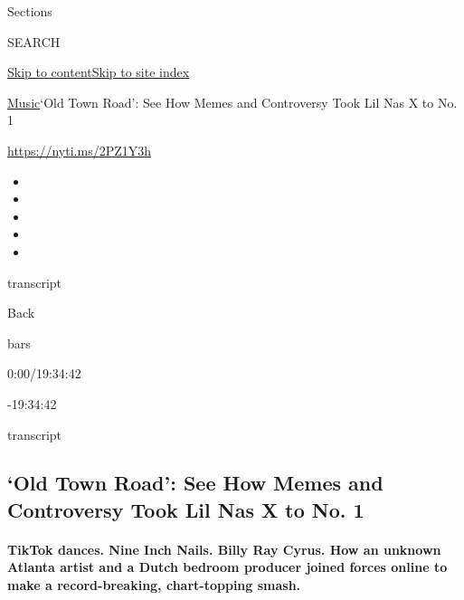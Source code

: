 Sections

SEARCH

\protect\hyperlink{site-content}{Skip to
content}\protect\hyperlink{site-index}{Skip to site index}

\href{/section/arts/music}{Music}\textbar{}`Old Town Road': See How
Memes and Controversy Took Lil Nas X to No. 1

\url{https://nyti.ms/2PZ1Y3h}

\begin{itemize}
\item
\item
\item
\item
\item
\end{itemize}

transcript

Back

bars

0:00/19:34:42

-19:34:42

transcript

\hypertarget{old-town-road-see-how-memes-and-controversy-took-lil-nas-x-to-no-1}{%
\subsection{`Old Town Road': See How Memes and Controversy Took Lil Nas
X to No.
1}\label{old-town-road-see-how-memes-and-controversy-took-lil-nas-x-to-no-1}}

\hypertarget{tiktok-dances-nine-inch-nails-billy-ray-cyrus-how-an-unknown-atlanta-artist-and-a-dutch-bedroom-producer-joined-forces-online-to-make-a-record-breaking-chart-topping-smash}{%
\paragraph{TikTok dances. Nine Inch Nails. Billy Ray Cyrus. How an
unknown Atlanta artist and a Dutch bedroom producer joined forces online
to make a record-breaking, chart-topping
smash.}\label{tiktok-dances-nine-inch-nails-billy-ray-cyrus-how-an-unknown-atlanta-artist-and-a-dutch-bedroom-producer-joined-forces-online-to-make-a-record-breaking-chart-topping-smash}}

